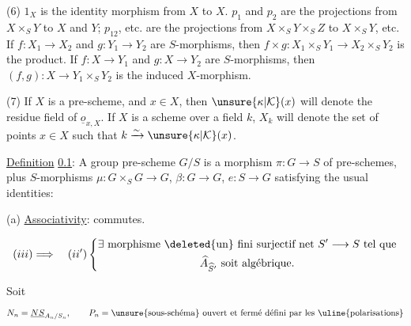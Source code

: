 (6) $1_X$ is the identity morphism from $X$ to $X$. $p_1$ and $p_2$ are the projections from $X\times_S Y$ to $X$ and $Y$; $p_{12}$, etc. are the projections from $X\times_S Y\times_S Z$ to $X\times_S Y$, etc. If $f:X_1\longrightarrow X_2$ and $g:Y_1\longrightarrow Y_2$ are $S$-morphisms, then $f\times g:X_1\times_S Y_1\longrightarrow X_2\times_S Y_2$ is the product. If $f:X\longrightarrow Y_1$ and $g:X\longrightarrow Y_2$ are $S$-morphisms, then $(f,g):X\longrightarrow Y_1\times_S Y_2$ is the induced $X$-morphism.

(7) If $X$ is a pre-scheme, and $x\in X$, then $\unsure{\kappa|\mathcal K}(x)$ will denote the residue field of $\underline o_{x,X}$. If $X$ is a scheme over a field $k$, $X_k$ will denote the set of points $x\in X$ such that $k\xrightarrow{\sim}\unsure{\kappa|\mathcal K}(x)$.


 \uline{Definition} \uline{0.1}: A group pre-scheme $G/S$ is a morphism $\pi:G\longrightarrow S$ of pre-schemes, plus $S$-morphisms $\mu:G\times_S G\longrightarrow G$, $\beta:G\longrightarrow G$, $e:S\longrightarrow G$ satisfying the usual identities:

(a) \uline{Associativity}:
 commutes.



\[
(iii)\Longrightarrow\quad (ii')\left\{\begin{gathered}\exists\text{ morphisme }\deleted{\text{un}}\text{ fini surjectif net }S'\longrightarrow S\text{ tel que}\\ \widehat A_{\widehat S'}\text{ soit algébrique.}\end{gathered}\right.
\]

Soit 
\[
N_n=\underline{NS}_{A_n/S_n},\qquad P_n=\text{\unsure{sous-schéma} ouvert et fermé défini par les \uline{polarisations}}
\]

